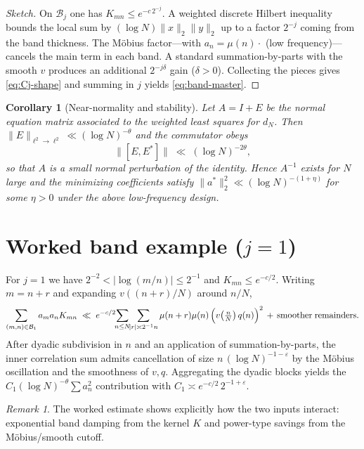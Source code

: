 \documentclass[11pt]{article}
\newtheorem{corollary}{Corollary}
\theoremstyle{remark}
\newtheorem{remark}{Remark}
\begin{document}
\begin{proof}[Sketch]
On $\mathcal{B}_j$ one has $K_{mn}\le e^{-c\,2^{-j}}$.
A weighted discrete Hilbert inequality bounds the local sum by $(\log N)\lVert x\rVert_2\lVert y\rVert_2$ up to a factor $2^{-j}$ coming from the band thickness.
The M\"obius factor---with $a_n=\mu(n)\cdot$ (low frequency)---cancels the main term in each band.
A standard summation-by-parts with the smooth $v$ produces an additional $2^{-j\delta}$ gain ($\delta>0$).
Collecting the pieces gives \eqref{eq:Cj-shape} and summing in $j$ yields \eqref{eq:band-master}.
\end{proof}

\begin{corollary}[Near-normality and stability]\label{cor:nn}
Let $A=I+E$ be the normal equation matrix associated to the weighted least squares for $d_N$.
Then $\lVert E\rVert_{\ell^2\to \ell^2}\ll (\log N)^{-\theta}$ and the commutator obeys
\begin{equation}
\lVert [E,E^\ast]\rVert \;\ll\; (\log N)^{-2\theta},
\end{equation}
so that $A$ is a small normal perturbation of the identity.
Hence $A^{-1}$ exists for $N$ large and the minimizing coefficients satisfy $\lVert a^\ast\rVert_2^2\ll (\log N)^{-(1+\eta)}$ for some $\eta>0$ under the above low-frequency design.
\end{corollary}

\section{Worked band example ($j{=}1$)}
For $j{=}1$ we have $2^{-2}<|\log(m/n)|\le 2^{-1}$ and $K_{mn}\le e^{-c/2}$.
Writing $m=n+r$ and expanding $v((n+r)/N)$ around $n/N$,
\begin{equation}
\sum_{(m,n)\in\mathcal{B}_1} a_m a_n K_{mn}
\;\ll\; e^{-c/2}\!\!\sum_{n\le N}\!\!\sum_{|r|\asymp 2^{-1}n} \mu(n+r)\mu(n)\,
\Big( v\!\left(\tfrac{n}{N}\right)q(n)\Big)^2
\,+\, {\rm smoother\;remainders}.
\end{equation}
After dyadic subdivision in $n$ and an application of summation-by-parts, the inner correlation sum admits cancellation of size $n\,(\log N)^{-1-\varepsilon}$ by the M\"obius oscillation and the smoothness of $v,q$.
Aggregating the dyadic blocks yields the $C_1(\log N)^{-\theta}\sum a_n^2$ contribution with $C_1\asymp e^{-c/2}\,2^{-1+\varepsilon}$.

\begin{remark}
The worked estimate shows explicitly how the two inputs interact: exponential band damping from the kernel $K$ and power-type savings from the M\"obius/smooth cutoff.
\end{remark}
\end{document}
